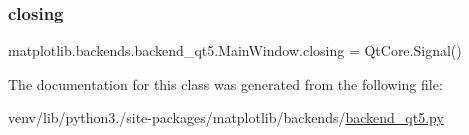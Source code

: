 \subsubsection{\texorpdfstring{closing}{closing}}
{\footnotesize\ttfamily matplotlib.\+backends.\+backend\+\_\+qt5.\+Main\+Window.\+closing = Qt\+Core.\+Signal()\hspace{0.3cm}{\ttfamily [static]}}



The documentation for this class was generated from the following file\+:\begin{DoxyCompactItemize}
\item 
venv/lib/python3./site-\/packages/matplotlib/backends/\hyperlink{backend__qt5_8py}{backend\+\_\+qt5.\+py}\end{DoxyCompactItemize}
